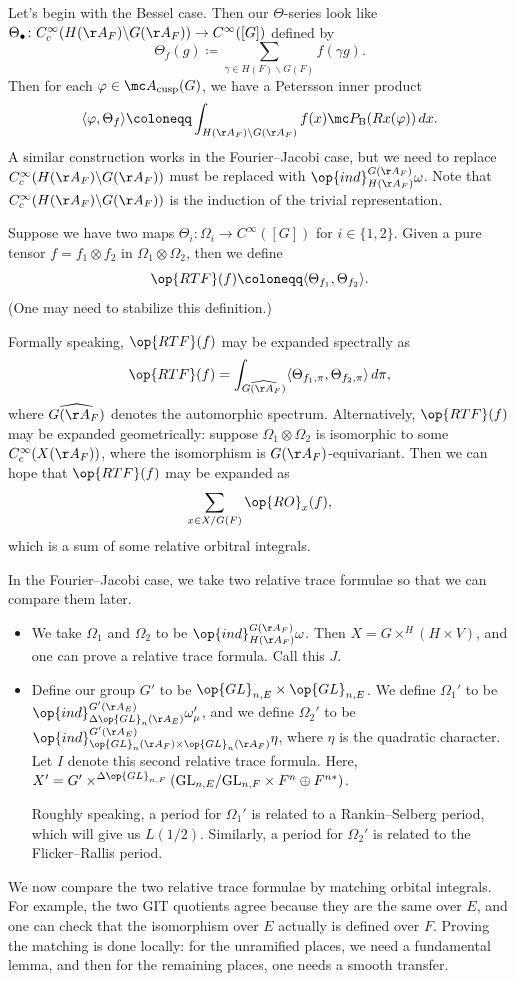 \documentclass{article}
\begin{document}
Let's begin with the Bessel case. Then our $\Theta$-series look like $\Theta_\bullet\colon C_c^\infty(H(\AA_F)\backslash G(\AA_F))\to C^\infty([G])$ defined by
\[\Theta_f(g)\coloneqq\sum_{\gamma\in H(F)\backslash G(F)}f(\gamma g).\]
Then for each $\varphi\in\mc A_{\mathrm{cusp}}(G)$, we have a Petersson inner product
\[\langle \varphi,\Theta_f\rangle\coloneqq\int_{H(\AA_F)\backslash G(\AA_F)}f(x)\mc P_{\mathrm B}(Rx(\varphi))\,dx.\]
A similar construction works in the Fourier--Jacobi case, but we need to replace $C_c^\infty(H(\AA_F)\backslash G(\AA_F))$ must be replaced with $\op{ind}_{H(\AA_F)}^{G(\AA_F)}\omega$. Note that $C_c^\infty(H(\AA_F)\backslash G(\AA_F))$ is the induction of the trivial representation.
\begin{notation}
	Suppose we have two maps $\Theta_i\colon\Omega_i\to C^\infty([G])$ for $i\in\{1,2\}$. Given a pure tensor $f=f_1\otimes f_2$ in $\Omega_1\otimes\Omega_2$, then we define
	\[\op{RTF}(f)\coloneqq\langle\Theta_{f_1},\Theta_{f_2}\rangle.\]
	(One may need to stabilize this definition.)
\end{notation}
Formally speaking, $\op{RTF}(f)$ may be expanded spectrally as
\[\op{RTF}(f)=\int_{\widehat{G(\AA_F)}}\langle\Theta_{f_1,\pi},\Theta_{f_2,\pi}\rangle\,d\pi,\]
where $\widehat{G(\AA_F)}$ denotes the automorphic spectrum. Alternatively, $\op{RTF}(f)$ may be expanded geometrically: suppose $\Omega_1\otimes\Omega_2$ is isomorphic to some $C_c^\infty(X(\AA_F))$, where the isomorphism is $G(\AA_F)$-equivariant. Then we can hope that $\op{RTF}(f)$ may be expanded as
\[\sum_{x\in X/G(F)}\op{RO}_x(f),\]
which is a sum of some relative orbitral integrals.
\begin{example}
	In the Fourier--Jacobi case, we take two relative trace formulae so that we can compare them later.
	\begin{itemize}
		\item We take $\Omega_1$ and $\Omega_2$ to be $\op{ind}_{H(\AA_F)}^{G(\AA_F)}\omega$. Then $X=G\times^H(H\times V)$, and one can prove a relative trace formula. Call this $J$.
		\item Define our group $G'$ to be $\op{GL}_{n,E}\times\op{GL}_{n,E}$. We define $\Omega_1'$ to be $\op{ind}_{\Delta\op{GL}_n(\AA_E)}^{G'(\AA_E)}\omega'_\mu$, and we define $\Omega_2'$ to be $\op{ind}^{G'(\AA_E)}_{\op{GL}_n(\AA_F)\times\op{GL}_n(\AA_F)}\eta$, where $\eta$ is the quadratic character. Let $I$ denote this second relative trace formula. Here, $X'=G'\times^{\Delta\op{GL}_{n,F}}(\mathrm{GL}_{n,E}/\mathrm{GL}_{n,F}\times F^n\oplus F^{n*})$.

		Roughly speaking, a period for $\Omega_1'$ is related to a Rankin--Selberg period, which will give us $L(1/2)$. Similarly, a period for $\Omega_2'$ is related to the Flicker--Rallis period.
	\end{itemize}
	We now compare the two relative trace formulae by matching orbital integrals. For example, the two GIT quotients agree because they are the same over $E$, and one can check that the isomorphism over $E$ actually is defined over $F$. Proving the matching is done locally: for the unramified places, we need a fundamental lemma, and then for the remaining places, one needs a smooth transfer.
\end{example}
\end{document}
